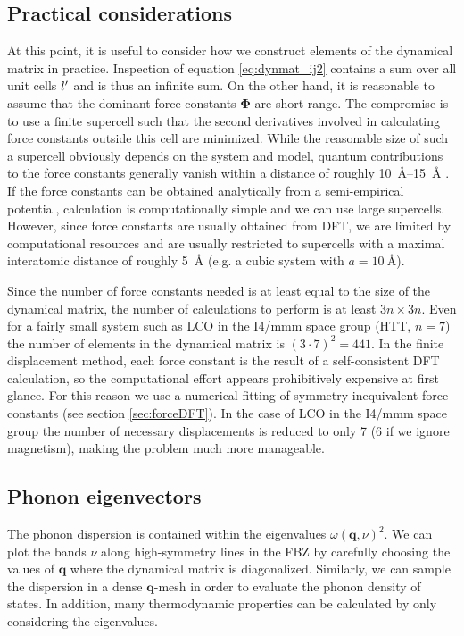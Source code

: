 \subsection{Practical considerations}\label{sec:phononpractical}
At this point, it is useful to consider how we construct elements of the dynamical matrix in practice. Inspection of equation \eqref{eq:dynmat_ij2} contains a sum over all unit cells $l^\prime$ and is thus an infinite sum. On the other hand, it is reasonable to assume that the dominant force constants $\bm{\Phi}$ are short range. The compromise is to use a finite supercell such that the second derivatives involved in calculating force constants outside this cell are minimized. While the reasonable size of such a supercell obviously depends on the system and model, quantum contributions to the force constants generally vanish within a distance of roughly \SIrange{10}{15}{\angstrom} . If the force constants can be obtained analytically from a semi-empirical potential, calculation is computationally simple and we can use large supercells. However, since force constants are usually obtained from DFT, we are limited by computational resources and are usually restricted to supercells with a maximal interatomic distance of roughly \SI{5}{\angstrom} (e.g. a cubic system with $a=\SI{10}{\angstrom}$).

Since the number of force constants needed is at least equal to the size of the dynamical matrix, the number of calculations to perform is at least $3n \times 3n$. Even for a fairly small system such as LCO in the I4/mmm space group (HTT, $n=7$) the number of elements in the dynamical matrix is $(3\cdot 7)^2 = 441$. In the finite displacement method, each force constant is the result of a self-consistent DFT calculation, so the computational effort appears prohibitively expensive at first glance. For this reason we use a numerical fitting of symmetry inequivalent force constants (see section \ref{sec:forceDFT}). In the case of LCO in the I4/mmm space group the number of necessary displacements is reduced to only 7 (6 if we ignore magnetism), making the problem much more manageable.

\subsection{Phonon eigenvectors}
The phonon dispersion is contained within the eigenvalues $\omega (\bm{q},\nu)^2$. We can plot the bands $\nu$ along high-symmetry lines in the FBZ by carefully choosing the values of $\bm{q}$ where the dynamical matrix is diagonalized. Similarly, we can sample the dispersion in a dense $\bm{q}$-mesh in order to evaluate the phonon density of states. In addition, many thermodynamic properties can be calculated by only considering the eigenvalues.

